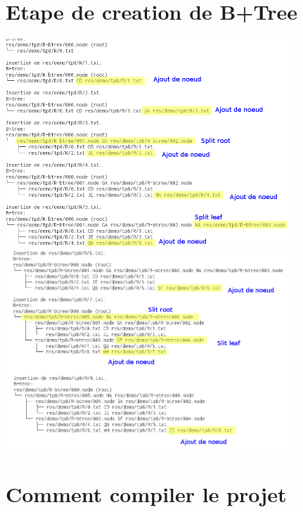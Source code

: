\documentclass[a4paper]{article}
\begin{document}
\section{Etape de creation de B+Tree}

\includegraphics[width=0.8\textwidth]{btree-1.png}
\newline
\includegraphics[width=0.8\textwidth]{btree-2.png}
\newline


\section{Comment compiler le projet}
\end{document}
